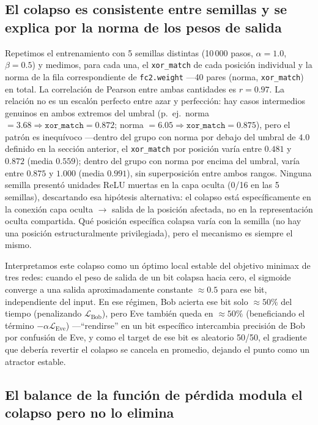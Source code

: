 \documentclass[manuscript,screen]{acmart}
\begin{document}
\subsection{El colapso es consistente entre semillas y se explica por la norma de los pesos de salida}

Repetimos el entrenamiento con 5 semillas distintas (10\,000 pasos, $\alpha=1.0$,
$\beta=0.5$) y medimos, para cada una, el \texttt{xor\_match} de cada posición individual y la
norma de la fila correspondiente de \texttt{fc2.weight} —40 pares (norma, \texttt{xor\_match})
en total. La correlación de Pearson entre ambas cantidades es $r=0.97$. La relación no es un
escalón perfecto entre azar y perfección: hay casos intermedios genuinos en ambos extremos del
umbral (p.~ej.\ norma $=3.68 \Rightarrow \texttt{xor\_match}=0.872$; norma $=6.05 \Rightarrow
\texttt{xor\_match}=0.875$), pero el patrón es inequívoco —dentro del grupo con norma por debajo
del umbral de $4.0$ definido en la sección anterior, el \texttt{xor\_match} por posición varía entre
$0.481$ y $0.872$ (media $0.559$); dentro del grupo con norma por encima del umbral, varía entre
$0.875$ y $1.000$ (media $0.991$), sin superposición entre ambos rangos. Ninguna semilla
presentó unidades ReLU muertas en la capa oculta (0/16 en las 5 semillas), descartando esa
hipótesis alternativa: el colapso está específicamente en la conexión capa oculta
$\rightarrow$ salida de la posición afectada, no en la representación oculta compartida. Qué
posición específica colapsa varía con la semilla (no hay una posición estructuralmente
privilegiada), pero el mecanismo es siempre el mismo.

Interpretamos este colapso como un óptimo local estable del objetivo minimax de tres redes:
cuando el peso de salida de un bit colapsa hacia cero, el sigmoide converge a una salida
aproximadamente constante $\approx 0.5$ para ese bit, independiente del input. En ese régimen,
Bob acierta ese bit solo $\approx 50\%$ del tiempo (penalizando $\mathcal{L}_{\text{Bob}}$),
pero Eve también queda en $\approx 50\%$ (beneficiando el término $-\alpha \mathcal{L}_{\text{Eve}}$)
—``rendirse'' en un bit específico intercambia precisión de Bob por confusión de Eve, y como el
target de ese bit es aleatorio 50/50, el gradiente que debería revertir el colapso se cancela en
promedio, dejando el punto como un atractor estable.

\subsection{El balance de la función de pérdida modula el colapso pero no lo elimina}
\end{document}

